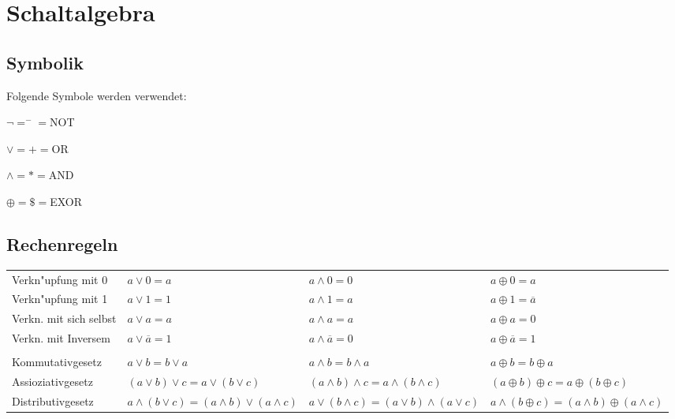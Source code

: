 \section{Schaltalgebra}
\subsection{Symbolik}
	Folgende Symbole werden verwendet:\\
	\begin{multicols}{4}
		$\neg=^-=$NOT
	\columnbreak
	
		$\vee=+=$OR
	\columnbreak
	
		$\wedge=*=$AND
	\columnbreak
	
		$\oplus=\$=$EXOR
	\end{multicols}
	
\subsection{Rechenregeln}
	\begin{tabular}{llll}
		Verkn"upfung mit 0 & $ a \vee 0 = a $ & $ a \wedge 0 = 0 $ & $ a \oplus 0 = a $\\
		Verkn"upfung mit 1 & $ a \vee 1 = 1 $ & $ a \wedge 1 = a $ & $ a \oplus 1 = \overline{a} $ \\
		Verkn. mit sich selbst & $ a \vee a = a $ & $ a \wedge a = a $ & $ a \oplus a = 0 $ \\
		Verkn. mit Inversem & $ a \vee \overline{a} = 1 $ & $ a \wedge \overline{a} = 0 $ & $ a \oplus \overline{a} = 1 $ \\
		\\
		Kommutativgesetz & $ a \vee b = b \vee a $ & $ a \wedge b = b \wedge a $ & $ a \oplus b = b \oplus a $\\
		Assioziativgesetz & $ (a \vee b) \vee c = a \vee (b \vee c) $ & $ (a \wedge b) \wedge c = a \wedge (b \wedge c) $ & $ (a \oplus b) \oplus c = a \oplus (b \oplus c) $ \\
		Distributivgesetz & $ a \wedge (b \vee c) = (a \wedge b) \vee (a \wedge c) $ & $ a \vee (b \wedge c) = (a \vee b) \wedge (a \vee c) $ & $ a \wedge (b \oplus c) = (a \wedge b) \oplus (a \wedge c) $ \\	
		\end{tabular}
		
